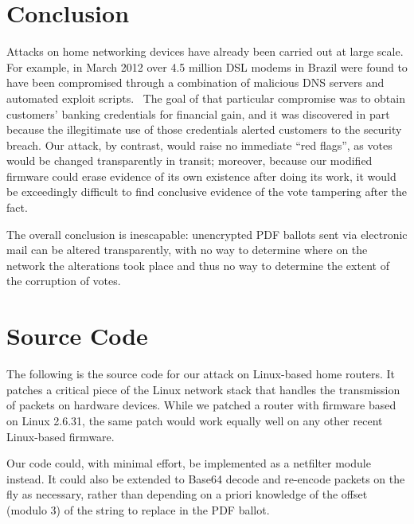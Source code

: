 \documentclass{article}
\begin{document}
\section{Conclusion}

Attacks on home networking devices have already been carried out at
large scale. For example, in March 2012 over 4.5 million DSL modems in
Brazil were found to have been compromised through a combination of
malicious DNS servers and automated exploit
scripts.~\cite{BrazilExploit} The goal of that particular compromise
was to obtain customers' banking credentials for financial gain, and
it was discovered in part because the illegitimate use of those
credentials alerted customers to the security breach. Our attack, by
contrast, would raise no immediate ``red flags'', as votes would be
changed transparently in transit; moreover, because our modified
firmware could erase evidence of its own existence after doing its
work, it would be exceedingly difficult to find conclusive evidence of
the vote tampering after the fact.

The overall conclusion is inescapable: unencrypted PDF ballots sent
via electronic mail can be altered transparently, with no way to
determine where on the network the alterations took place and thus no
way to determine the extent of the corruption of votes. 




\pagebreak
\appendix
\section{Source Code}
\label{section:source}



The following is the source code for our attack on Linux-based home
routers. It patches a critical piece of the Linux network stack that
handles the transmission of packets on hardware devices. While we
patched a router with firmware based on Linux 2.6.31, the same patch
would work equally well on any other recent Linux-based firmware. 

Our code could, with minimal effort, be implemented as a netfilter
module instead. It could also be extended to Base64 decode and
re-encode packets on the fly as necessary, rather than depending on a
priori knowledge of the offset (modulo 3) of the string to replace
in the PDF ballot.


\end{document}
